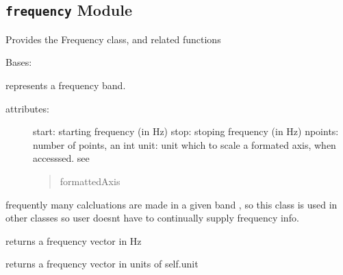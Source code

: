 \documentclass[letterpaper,10pt,english]{sphinxmanual}
\begin{document}
\subsection{\texttt{frequency} Module}
\label{api/mwavepy:module-mwavepy.frequency}\label{api/mwavepy:frequency-module}
Provides the Frequency class, and related functions

\begin{fulllineitems}
\label{api/mwavepy:mwavepy.frequency.Frequency}
Bases: 

represents a frequency band.
\begin{description}
\item[{attributes:}] \leavevmode
start: starting frequency  (in Hz)
stop: stoping frequency  (in Hz)
npoints: number of points, an int
unit: unit which to scale a formated axis, when accesssed. see
\begin{quote}

formattedAxis
\end{quote}

\end{description}

frequently many calcluations are made in a given band , so this class 
is used in other classes so user doesnt have to continually supply 
frequency info.

\begin{fulllineitems}
\label{api/mwavepy:mwavepy.frequency.Frequency.center}
\end{fulllineitems}


\begin{fulllineitems}
\label{api/mwavepy:mwavepy.frequency.Frequency.f}
returns a frequency vector  in Hz

\end{fulllineitems}


\begin{fulllineitems}
\label{api/mwavepy:mwavepy.frequency.Frequency.f_scaled}
returns a frequency vector in units of self.unit


\end{fulllineitems}
\end{fulllineitems}
\end{document}
